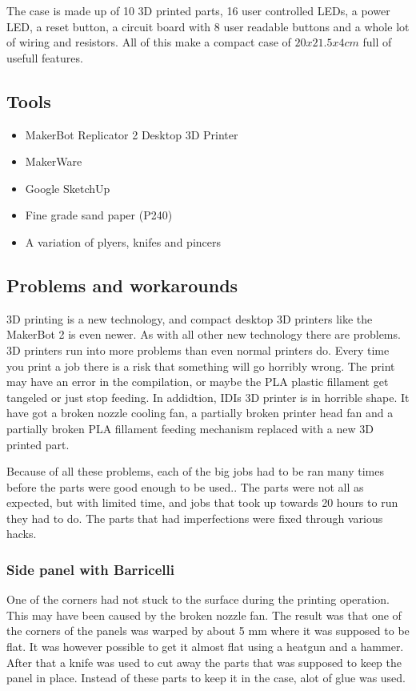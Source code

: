 The case is made up of 10 3D printed parts, 16 user controlled LEDs, a power LED, a reset button, a circuit board with 8 user readable buttons and a whole lot of wiring and resistors.
All of this make a compact case of $20 x 21.5 x 4 cm$ full of usefull features.

\subsection{Tools}

\begin{itemize}
    \item MakerBot Replicator 2 Desktop 3D Printer
    \item MakerWare
    \item Google SketchUp
    \item Fine grade sand paper (P240)
    \item A variation of plyers, knifes and pincers
\end{itemize}

\subsection{Problems and workarounds}

3D printing is a new technology, and compact desktop 3D printers like the MakerBot 2 is even newer.
As with all other new technology there are problems.
3D printers run into more problems than even normal printers do.
Every time you print a job there is a risk that something will go horribly wrong.
The print may have an error in the compilation, or maybe the PLA plastic fillament get tangeled or just stop feeding.
In addidtion, IDIs 3D printer is in horrible shape.
It have got a broken nozzle cooling fan, a partially broken printer head fan and a partially broken PLA fillament feeding mechanism replaced with a new 3D printed part.

Because of all these problems, each of the big jobs had to be ran many times before the parts were good enough to be used..
The parts were not all as expected, but with limited time, and jobs that took up towards 20 hours to run they had to do.
The parts that had imperfections were fixed through various hacks.

\subsubsection*{Side panel with Barricelli}
One of the corners had not stuck to the surface during the printing operation.
This may have been caused by the broken nozzle fan.
The result was that one of the corners of the panels was warped by about 5 mm where it was supposed to be flat.
It was however possible to get it almost flat using a heatgun and a hammer.
After that a knife was used to cut away the parts that was supposed to keep the panel in place.
Instead of these parts to keep it in the case, alot of glue was used.

